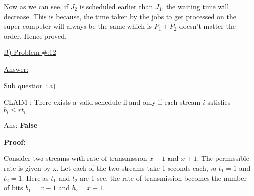 \documentclass[letterpaper,portrait,12pt]{article}
\begin{document}
\begin{flushleft}

\end{flushleft}


\begin{flushleft}
Now as we can see, if $J_2$ is scheduled earlier than $J_1$, the waiting time will decrease. This is because, the time taken by the jobs to get processed on the super computer will always be the same which is $P_1+P_2$ doesn't matter the order. Hence proved.\uline{\newpage
}
\end{flushleft}


\begin{flushleft}
\uline{B) Problem \#:12}
\end{flushleft}


\begin{flushleft}
\uline{Answer:}
\end{flushleft}


\begin{flushleft}

\end{flushleft}


\begin{flushleft}
\uline{Sub question : a)}
\end{flushleft}


\begin{flushleft}
CLAIM : There exists a valid schedule if and only if each stream $i$ satisfies $b_i \le rt_i$
\end{flushleft}


\begin{flushleft}
Ans: \textbf{False}
\end{flushleft}


\begin{flushleft}
\textbf{Proof: }
\end{flushleft}


\begin{flushleft}
Consider two streams with rate of transmission $x-1$ and $x+1$. The permissible rate is given by x. Let each of the two streams take 1 seconds each, so $t_1=1$ and $t_2=1$. Here as $t_1 $ and $t_2$ are 1 sec, the rate of transmission becomes the number of bits $b_1 = x-1$ and $b_2 = x+1$.
\end{flushleft}


\begin{flushleft}

\end{flushleft}
\end{document}
